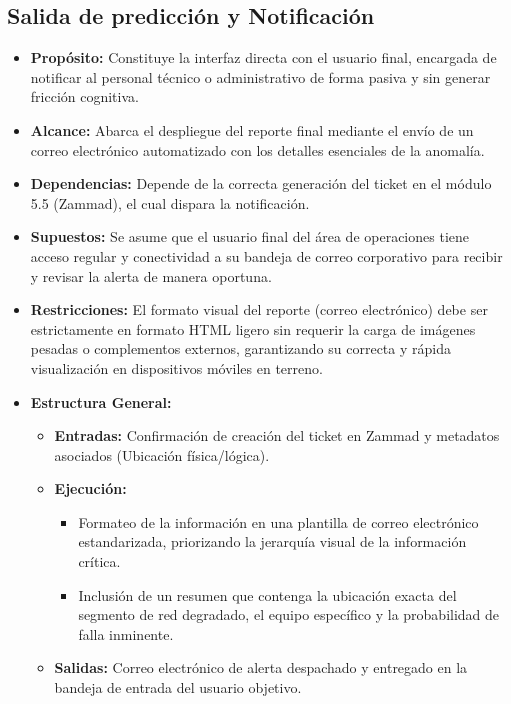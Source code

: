 \documentclass[12pt,a4paper]{article}
\begin{document}
    \subsection{Salida de predicción y Notificación}
    \begin{itemize}
        \item \textbf{Propósito:} Constituye la interfaz directa con el usuario final, encargada de notificar al personal técnico o administrativo de forma pasiva y sin generar fricción cognitiva.

        \item \textbf{Alcance:} Abarca el despliegue del reporte final mediante el envío de un correo electrónico automatizado con los detalles esenciales de la anomalía.
        \item \textbf{Dependencias:} Depende de la correcta generación del ticket en el módulo 5.5 (Zammad), el cual dispara la notificación.
        \item \textbf{Supuestos:} Se asume que el usuario final del área de operaciones tiene acceso regular y conectividad a su bandeja de correo corporativo para recibir y revisar la alerta de manera oportuna.
        \item \textbf{Restricciones:} El formato visual del reporte (correo electrónico) debe ser estrictamente en formato HTML ligero sin requerir la carga de imágenes pesadas o complementos externos, garantizando su correcta y rápida visualización en dispositivos móviles en terreno.
        \item \textbf{Estructura General:} 
        \begin{itemize}
            \item \textbf{Entradas:} Confirmación de creación del ticket en Zammad y metadatos asociados (Ubicación física/lógica).
            \item \textbf{Ejecución:}
            \begin{itemize}
                \item Formateo de la información en una plantilla de correo electrónico estandarizada, priorizando la jerarquía visual de la información crítica.
                \item Inclusión de un resumen que contenga la ubicación exacta del segmento de red degradado, el equipo específico y la probabilidad de falla inminente.
            \end{itemize}
            \item \textbf{Salidas:} Correo electrónico de alerta despachado y entregado en la bandeja de entrada del usuario objetivo.
        \end{itemize}
    \end{itemize}
\end{document}
